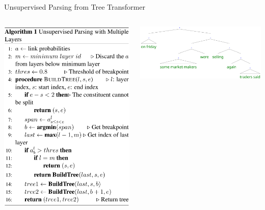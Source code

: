 \documentclass[unicode, 12pt, aspectratio=43]{beamer}
\begin{document}
\begin{frame}[label={sec:org259673a}]{\large Unsupervised Parsing from Tree Transformer}
\begin{columns}
\begin{column}{0.5\columnwidth}
\begin{center}
\includegraphics[width=\linewidth]{./figure/Algorithm1.pdf}
\end{center}
\end{column}

\begin{column}{0.6\columnwidth}
\begin{center}
\includegraphics[width=\linewidth]{./figure/Figure3.pdf}
\end{center}
\end{column}
\end{columns}
\end{frame}
\end{document}
